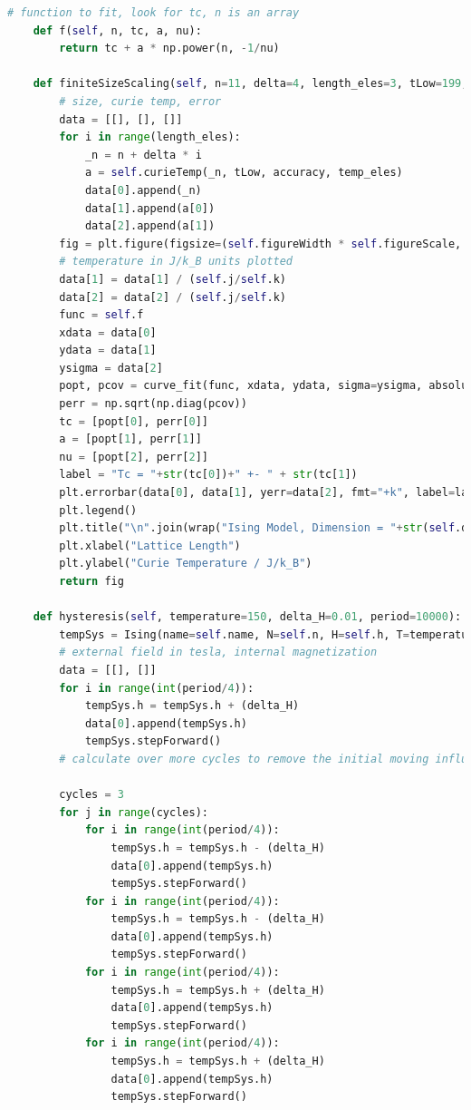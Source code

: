 \documentclass[%
showkeys,
bibnotes,
amsmath,amssymb,
floatfix,
]{revtex4-1}
\begin{document}
\begin{lstlisting}[language=Python]
    # function to fit, look for tc, n is an array
    def f(self, n, tc, a, nu):
        return tc + a * np.power(n, -1/nu)

    def finiteSizeScaling(self, n=11, delta=4, length_eles=3, tLow=199, accuracy=0.6, temp_eles=10):
        # size, curie temp, error
        data = [[], [], []]
        for i in range(length_eles):
            _n = n + delta * i
            a = self.curieTemp(_n, tLow, accuracy, temp_eles)
            data[0].append(_n)
            data[1].append(a[0])
            data[2].append(a[1])
        fig = plt.figure(figsize=(self.figureWidth * self.figureScale, self.figureHeight * self.figureScale), dpi=self.figureDpi)
        # temperature in J/k_B units plotted
        data[1] = data[1] / (self.j/self.k)
        data[2] = data[2] / (self.j/self.k)
        func = self.f
        xdata = data[0]
        ydata = data[1]
        ysigma = data[2]
        popt, pcov = curve_fit(func, xdata, ydata, sigma=ysigma, absolute_sigma=True)
        perr = np.sqrt(np.diag(pcov))
        tc = [popt[0], perr[0]]
        a = [popt[1], perr[1]]
        nu = [popt[2], perr[2]]
        label = "Tc = "+str(tc[0])+" +- " + str(tc[1])
        plt.errorbar(data[0], data[1], yerr=data[2], fmt="+k", label=label)
        plt.legend()
        plt.title("\n".join(wrap("Ising Model, Dimension = "+str(self.d)+", Tc = "+str(sigfig.round(float(self.tc), sigfigs=4))+"K, Time = "+str(self.steps)+"a.u.", 60)))
        plt.xlabel("Lattice Length")
        plt.ylabel("Curie Temperature / J/k_B")
        return fig

    def hysteresis(self, temperature=150, delta_H=0.01, period=10000):
        tempSys = Ising(name=self.name, N=self.n, H=self.h, T=temperature, D=self.d, J=self.j, randomFill=self.randomFill, K=self.k, M=self.m, equilibriumTime=self.equilibriumTime, numberOfMeasurements=self.numberOfMeasurements)
        # external field in tesla, internal magnetization
        data = [[], []]
        for i in range(int(period/4)):
            tempSys.h = tempSys.h + (delta_H)
            data[0].append(tempSys.h)
            tempSys.stepForward()
        # calculate over more cycles to remove the initial moving influence
        
        cycles = 3
        for j in range(cycles): 
            for i in range(int(period/4)):
                tempSys.h = tempSys.h - (delta_H)
                data[0].append(tempSys.h)
                tempSys.stepForward()
            for i in range(int(period/4)):
                tempSys.h = tempSys.h - (delta_H)
                data[0].append(tempSys.h)
                tempSys.stepForward()
            for i in range(int(period/4)):
                tempSys.h = tempSys.h + (delta_H)
                data[0].append(tempSys.h)
                tempSys.stepForward()
            for i in range(int(period/4)):
                tempSys.h = tempSys.h + (delta_H)
                data[0].append(tempSys.h)
                tempSys.stepForward()


\end{lstlisting}
\end{document}
